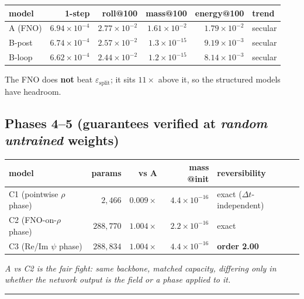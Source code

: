 \documentclass[11pt,a4paper]{article}
\theoremstyle{plain}
\theoremstyle{definition}
\theoremstyle{remark}
\newcommand{\dt}{\Delta t}
\newcommand{\epssplit}{\varepsilon_{\mathrm{split}}}
\begin{document}
\begin{center}
\begin{tabular}{@{}lrrrrl@{}}
\toprule
\textbf{model} & \textbf{1-step} & \textbf{roll@100} & \textbf{mass@100} & \textbf{energy@100} & \textbf{trend}\\
\midrule
A \; (FNO) & $6.94\times10^{-4}$ & $2.77\times10^{-2}$ & $1.61\times10^{-2}$ & $1.79\times10^{-2}$ & secular\\
B-post & $6.74\times10^{-4}$ & $2.57\times10^{-2}$ & $1.3\times10^{-15}$ & $9.19\times10^{-3}$ & secular\\
B-loop & $6.62\times10^{-4}$ & $2.44\times10^{-2}$ & $1.2\times10^{-15}$ & $8.14\times10^{-3}$ & secular\\
\bottomrule
\end{tabular}
\end{center}

The FNO does \textbf{not} beat $\epssplit$; it sits $11\times$ above it, so the structured
models have headroom.

\subsection*{Phases 4--5 (guarantees verified at \emph{random untrained} weights)}

\begin{center}
\begin{tabular}{@{}lrrrl@{}}
\toprule
\textbf{model} & \textbf{params} & \textbf{vs A} & \textbf{mass @init} & \textbf{reversibility}\\
\midrule
C1 (pointwise $\rho$ phase) & $2{,}466$ & $0.009\times$ & $4.4\times10^{-16}$ & exact ($\dt$-independent)\\
C2 (FNO-on-$\rho$ phase) & $288{,}770$ & $1.004\times$ & $2.2\times10^{-16}$ & exact\\
C3 (Re/Im $\psi$ phase) & $288{,}834$ & $1.004\times$ & $4.4\times10^{-16}$ & \textbf{order 2.00}\\
\bottomrule
\end{tabular}
\end{center}

\begin{center}
\emph{A vs C2 is the fair fight: same backbone, matched capacity, differing only in whether
the network output is the field or a phase applied to it.}
\end{center}

\vspace{1.5em}
\hrule
\vspace{0.8em}
\end{document}
